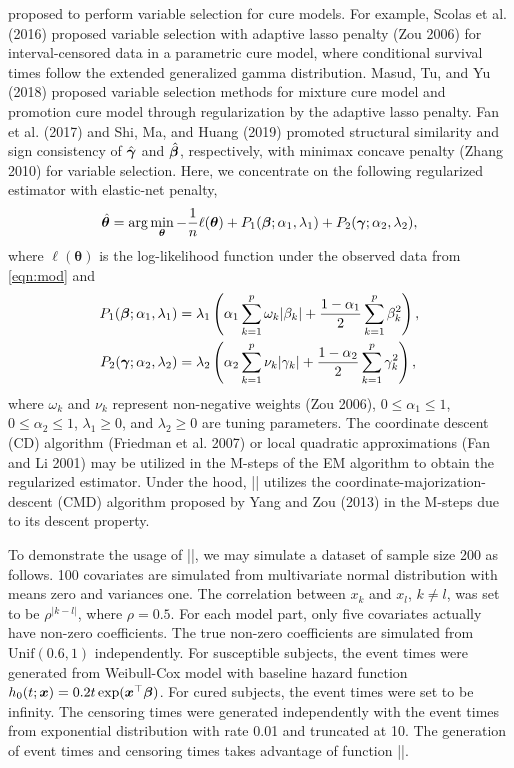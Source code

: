 proposed to perform variable selection for cure models. For example,
Scolas et al. (2016) proposed variable selection with adaptive lasso
penalty (Zou 2006) for interval-censored data in a parametric cure
model, where conditional survival times follow the extended generalized
gamma distribution. Masud, Tu, and Yu (2018) proposed variable selection
methods for mixture cure model and promotion cure model through
regularization by the adaptive lasso penalty. Fan et al. (2017) and Shi,
Ma, and Huang (2019) promoted structural similarity and sign consistency
of \(\hat{\bm{\gamma}}\) and \(\hat{\bm{\beta}}\), respectively, with minimax concave
penalty (Zhang 2010) for variable selection. Here, we concentrate on the
following regularized estimator with elastic-net penalty, \begin{align}
  \hat{\bm{\theta}} = \arg\min_{\bm{\theta}} -\frac{1}{n}
  \ell(\bm{\theta})
  + P_{1}(\bm{\beta}; \alpha_1, \lambda_1) + P_{2}(\bm{\gamma}; \alpha_2, \lambda_2),
\end{align} where \(\ell(\bm{\theta})\) is the log-likelihood function
under the observed data from \eqref{eqn:mod} and \begin{align*}
  P_{1}(\bm{\beta}; \alpha_1, \lambda_1)
  & = \lambda_1 \left( \alpha_1 \sum_{k=1}^{p} \omega_k \lvert \beta_k \rvert +
  \frac{1 - \alpha_1}{2} \sum_{k=1}^{p} \beta_k^2\right),\\
  P_{2}(\bm{\gamma}; \alpha_2, \lambda_2)
  & = \lambda_2 \left( \alpha_2 \sum_{k=1}^{p} \nu_k \lvert \gamma_k \rvert +
  \frac{1 - \alpha_2}{2} \sum_{k=1}^{p} \gamma_k^2 \right),
\end{align*} where \(\omega_k\) and \(\nu_k\) represent non-negative
weights (Zou 2006), \(0\le\alpha_1\le1\), \(0\le\alpha_2\le1\),
\(\lambda_1\ge0\), and \(\lambda_2\ge0\) are tuning parameters. The
coordinate descent (CD) algorithm (Friedman et al. 2007) or local
quadratic approximations (Fan and Li 2001) may be utilized in the
M-steps of the EM algorithm to obtain the regularized estimator. Under
the hood, \VERB|\NormalTok{()}| utilizes
the coordinate-majorization-descent (CMD) algorithm proposed by Yang and
Zou (2013) in the M-steps due to its descent property.

To demonstrate the usage of
\VERB|\NormalTok{()}|, we may simulate a
dataset of sample size 200 as follows. 100 covariates are simulated from
multivariate normal distribution with means zero and variances one. The
correlation between \(x_k\) and \(x_l\), \(k\neq l\), was set to be
\(\rho^{\lvert k - l \rvert}\), where \(\rho = 0.5\). For each model
part, only five covariates actually have non-zero coefficients. The true
non-zero coefficients are simulated from \(\mathrm{Unif}(0.6, 1)\)
independently. For susceptible subjects, the event times were generated
from Weibull-Cox model with baseline hazard function
\(h_0(t; \bm{x}) = 0.2t\exp(\bm{x}^{\top}\bm{\beta})\). For cured subjects, the event
times were set to be infinity. The censoring times were generated
independently with the event times from exponential distribution with
rate 0.01 and truncated at 10. The generation of event times and
censoring times takes advantage of function
\VERB|\OperatorTok{::}\NormalTok{()}|.

